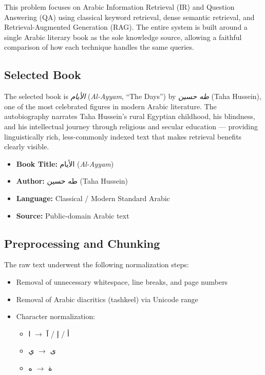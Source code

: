 This problem focuses on Arabic Information Retrieval (IR) and Question
Answering (QA) using classical keyword retrieval, dense semantic retrieval,
and Retrieval-Augmented Generation (RAG).  The entire system is built
around a single Arabic literary book as the sole knowledge source, allowing
a faithful comparison of how each technique handles the same queries.

\subsection{Selected Book}

The selected book is \textit{\textarabic{الأيام}} (\textit{Al-Ayyam}, ``The Days'')
by \textit{\textarabic{طه حسين}} (Taha Hussein), one of the most celebrated
figures in modern Arabic literature.  The autobiography narrates Taha
Hussein's rural Egyptian childhood, his blindness, and his intellectual
journey through religious and secular education --- providing linguistically
rich, less-commonly indexed text that makes retrieval benefits clearly
visible.

\begin{itemize}
  \item \textbf{Book Title:} \textarabic{الأيام} (\textit{Al-Ayyam})
  \item \textbf{Author:} \textarabic{طه حسين} (Taha Hussein)
  \item \textbf{Language:} Classical / Modern Standard Arabic
  \item \textbf{Source:} Public-domain Arabic text
\end{itemize}

\subsection{Preprocessing and Chunking}

The raw text underwent the following normalization steps:

\begin{itemize}
  \item Removal of unnecessary whitespace, line breaks, and page numbers
  \item Removal of Arabic diacritics (tashkeel) via Unicode range
  \item Character normalization:
    \begin{itemize}
      \item \textarabic{أ} / \textarabic{إ} / \textarabic{آ}
            $\rightarrow$ \textarabic{ا}
      \item \textarabic{ى} $\rightarrow$ \textarabic{ي}
      \item \textarabic{ة} $\rightarrow$ \textarabic{ه}
    \end{itemize}
\end{itemize}

